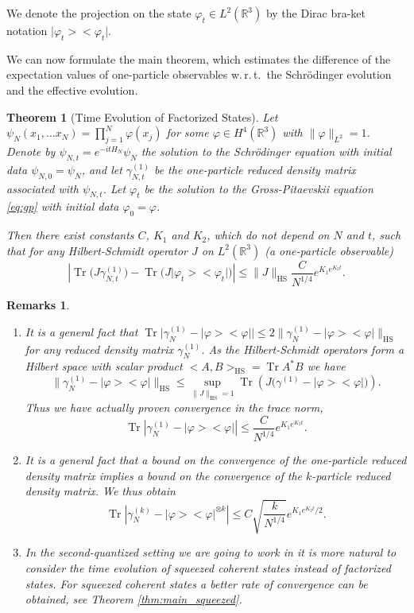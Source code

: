 \documentclass[11pt,a4paper,draft,DIV11]{scrartcl}	%
\newtheorem{thm}{Theorem}[section]
\newtheorem*{rems}{Remarks}
\newcommand{\scal}[2]{\big<#1,#2\big>} %
\newcommand{\Rbb}{\mathbb{R}}		%
\newcommand{\norm}[1]{\lVert#1\rVert}	%
\newcommand{\project}[1]{\lvert #1 \big>\big< #1\rvert}	%
\newcommand{\Tr}{\operatorname{Tr}}	%
\newcommand{\HS}{_{\textrm{HS}}}
\newcommand{\bd}{\begin{displaymath}}			%
\newcommand{\ed}{\end{displaymath}}
\newcommand{\eqr}[1]{\eqref{eq:#1}}			%
\begin{document}
We denote the projection on the state $\varphi_t \in L^2(\Rbb^3)$ by the Dirac bra-ket notation $\project{\varphi_t}$.

We can now formulate the main theorem, which estimates the difference of the expectation values of one-particle observables w.\,r.\,t.\ the Schr\"odinger evolution and the effective evolution.

\begin{thm}[Time Evolution of Factorized States] \label{thm:main_factorized}
 Let $\psi_N(x_1, \ldots x_N) = \prod_{j=1}^N \varphi(x_j)$ for some $\varphi \in H^4(\Rbb^3)$ with $\norm{\varphi}_{L^2} = 1$. Denote by $\psi_{N,t} = e^{-it H_N}\psi_N$ the solution to the Schr\"odinger equation with initial data $\psi_{N,0}= \psi_N$, and let $\gamma_{N,t}^{(1)}$ be the one-particle reduced density matrix associated with $\psi_{N,t}$.
Let $\varphi_t$ be the solution to the Gross-Pitaevskii equation \eqr{gp} with initial data $\varphi_0 = \varphi$.

 Then there exist constants $C$, $K_1$ and $K_2$, which do not depend on $N$
 and $t$, such that for any Hilbert-Schmidt operator $J$ on $L^2(\Rbb^3)$ (a one-particle observable)
\bd
\left\lvert \Tr\Big(J \gamma_{N,t}^{(1)} \Big) - \Tr\Big( J \project{\varphi_t}  \Big) \right\rvert \leq \norm{J}\HS \frac{C}{N^{1/4}}e^{K_1 e^{K_2 t}}.
\ed
\end{thm}

\begin{rems}
\begin{enumerate}
\item It is a general fact \cite{RS2009} that $\Tr \big\lvert \gamma_{N}^{(1)} - \project{\varphi} \big\rvert \leq 2 \norm{\gamma_N^{(1)} - \project{\varphi}}\HS$ for any reduced density matrix $\gamma^{(1)}_N$. As the Hilbert-Schmidt operators form a Hilbert space with scalar product $\scal{A}{B}\HS = \Tr A^\ast B$ we have 
\[\norm{\gamma_N^{(1)} - \project{\varphi}}\HS \leq \sup_{\norm{J}\HS=1} \Tr \left( J \big( \gamma^{(1)}- \project{\varphi} \big) \right).\]
 Thus we have actually proven convergence in the trace norm,
\bd
\Tr \left\lvert \gamma_{N}^{(1)} - \project{\varphi} \right\rvert \leq \frac{C}{N^{1/4}}e^{K_1 e^{K_2 t}}.
\ed
\item It is a general fact \cite{KP2009} that a bound on the convergence of the one-particle reduced density matrix implies a bound on the convergence of the $k$-particle reduced density matrix. We thus obtain
\bd
\Tr \left\lvert \gamma_{N}^{(k)} - \project{\varphi}^{\otimes k} \right\rvert \leq C\sqrt{ \frac{k}{ N^{1/4} } }e^{K_1 e^{K_2 t}/2}.
\ed
\item In the second-quantized setting we are going to work in it is more natural to consider the time evolution of squeezed coherent states instead of factorized states. For squeezed coherent states a better rate of convergence can be obtained, see Theorem \ref{thm:main_squeezed}.
\end{enumerate}
\end{rems}
\end{document}
